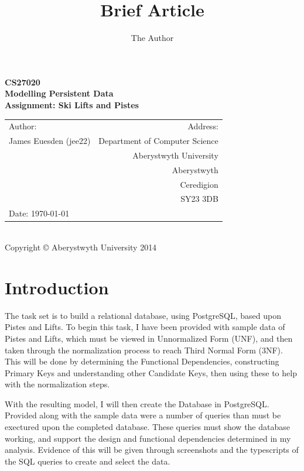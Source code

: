 \documentclass[11pt]{scrartcl} %
\title{Brief Article}
\author{The Author}
\begin{document}
\newpage

\begin{center}
\textbf{\LARGE CS27020}\\[0.3cm]
\textbf{\LARGE Modelling Persistent Data}\\[0.5cm]
\textbf{\LARGE Assignment: Ski Lifts and Pistes }\\[13cm]

\begin{tabular}{ l | r }
{\large Author:} & {\large Address:} \\
James Euesden (jee22) &  Department of Computer Science \\
 & Aberystwyth University \\ 
 & Aberystwyth \\
 & Ceredigion \\
 & SY23 3DB \\
{\large Date:} \today  &  \\

\end{tabular} \\[0.2cm]

{\small Copyright © Aberystwyth University 2014}

\end{center}



\newpage

\section{Introduction}
The task set is to build a relational database, using PostgreSQL, based upon Pistes and Lifts. To begin this task, I have been provided with sample data of Pistes and Lifts, which must be viewed in Unnormalized Form (UNF), and then taken through the normalization process to reach Third Normal Form (3NF). This will be done by determining the Functional Dependencies, constructing Primary Keys and understanding other Candidate Keys, then using these to help with the normalization steps.

With the resulting model, I will then create the Database in PostgreSQL. Provided along with the sample data were a number of queries than must be exectured upon the completed database. These queries must show the database working, and support the design and functional dependencies determined in my analysis. Evidence of this will be given through screenshots and the typescripts of the SQL queries to create and select the data.
\end{document}

